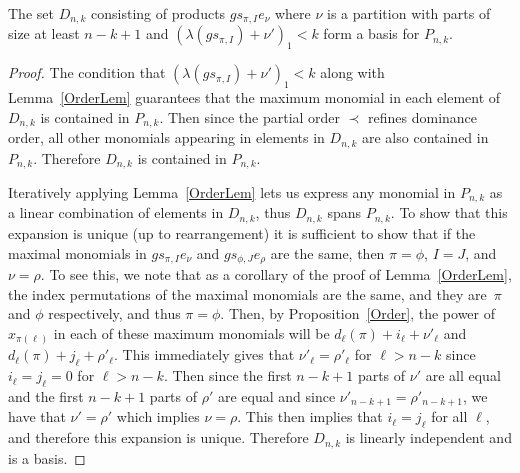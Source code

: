 \documentclass[ALCO,ThmDefs,Unicode,epreuves]{cedram}
\begin{document}
\begin{prop}
\label{BasisProp}

	The set $D_{n,k}$ consisting of products $gs_{\pi,I}e_\nu$ where $\nu$ is a partition with parts of size at least $n-k+1$ 
and $(\lambda(gs_{\pi,I})+\nu')_1<k$ form a basis for $P_{n,k}$.
	\begin{proof}

The condition that $(\lambda(gs_{\pi,I})+\nu')_1<k$ along with Lemma~\ref{OrderLem} guarantees that the maximum monomial in 
each element of $D_{n,k}$ is contained in $P_{n,k}$. Then since the partial order $\prec$ refines dominance order, all other 
monomials appearing in elements in $D_{n,k}$ are also contained in $P_{n,k}$. Therefore $D_{n,k}$ is contained in $P_{n,k}$. 

Iteratively applying Lemma~\ref{OrderLem} lets us express any monomial in $P_{n,k}$ as a linear combination of elements in 
$D_{n,k}$, thus $D_{n,k}$ spans $P_{n,k}$. To show that this expansion is unique (up to rearrangement) it is sufficient to 
show that if the maximal monomials in $gs_{\pi,I}e_{\nu}$ and $gs_{\phi,J}e_{\rho}$ are the same, then $\pi=\phi$, $I=J$, and 
$\nu=\rho$. To see this, we note that as a corollary of the proof of Lemma~\ref{OrderLem}, the index permutations of the 
maximal monomials are the same, and they are~$\pi$ and $\phi$ respectively, and thus $\pi=\phi$. Then, by Proposition~\ref{Order}, the power of $x_{\pi(\ell)}$ in each of these maximum monomials will be $d_\ell(\pi)+i_\ell+\nu'_\ell$ and 
$d_\ell(\pi)+j_\ell+\rho'_\ell$. This immediately gives that $\nu'_\ell=\rho'_\ell$ for $\ell>n-k$ since $i_\ell=j_\ell=0$ for 
$\ell>n-k$. Then since the first $n-k+1$ parts of $\nu'$ are all equal and the first $n-k+1$ parts of $\rho'$ are equal and 
since $\nu'_{n-k+1}=\rho'_{n-k+1}$, we have that $\nu'=\rho'$ which implies $\nu=\rho$. This then implies that $i_\ell=j_\ell$ 
for all $\ell$, and therefore this expansion is unique. Therefore $D_{n,k}$ is linearly independent and is a basis.
	\end{proof}

\end{prop}
\end{document}
